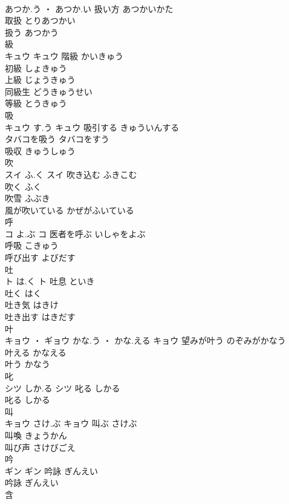 \documentclass[8pt]{extreport}
\begin{document}
\begin{CJK}{UTF8}{min}
\\	あつか.う ・ あつか.い		扱い方	あつかいかた	
\\	取扱	とりあつかい	
\\	扱う	あつかう	
\\	級	
\\	キュウ		キュウ	階級	かいきゅう	
\\	初級	しょきゅう	
\\	上級	じょうきゅう	
\\	同級生	どうきゅうせい	
\\	等級	とうきゅう	
\\	吸	
\\	キュウ	す.う	キュウ	吸引する	きゅういんする	
\\	タバコを吸う	タバコをすう	
\\	吸収	きゅうしゅう	
\\	吹	
\\	スイ	ふ.く	スイ	吹き込む	ふきこむ	
\\	吹く	ふく	
\\	吹雪	ふぶき	
\\	風が吹いている	かぜがふいている	
\\	呼	
\\	コ	よ.ぶ	コ	医者を呼ぶ	いしゃをよぶ	
\\	呼吸	こきゅう	
\\	呼び出す	よびだす	
\\	吐	
\\	ト	は.く	ト	吐息	といき	
\\	吐く	はく	
\\	吐き気	はきけ	
\\	吐き出す	はきだす	
\\	叶	
\\	キョウ ・ ギョウ	かな.う ・ かな.える	キョウ	望みが叶う	のぞみがかなう	
\\	叶える	かなえる	
\\	叶う	かなう	
\\	叱	
\\	シツ	しか.る	シツ	叱る	しかる	
\\	叱る	しかる	
\\	叫	
\\	キョウ	さけ.ぶ	キョウ	叫ぶ	さけぶ	
\\	叫喚	きょうかん	
\\	叫び声	さけびごえ	
\\	吟	
\\	ギン		ギン	吟詠	ぎんえい	
\\	吟詠	ぎんえい	
\\	含	

\end{CJK}
\end{document}
